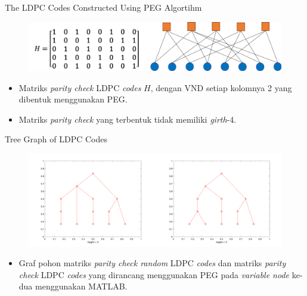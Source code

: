 \documentclass[11pt, aspectratio=169]{beamer}
\begin{document}
\begin{frame}{The LDPC Codes Constructed  Using PEG Algortihm}

\begin{figure}
	\centering 
	\includegraphics[scale=0.6]{gambarafa/PEGH}
	\centering 
	
	
\end{figure}
\begin{itemize}
	\item Matriks \textit{parity check} LDPC \textit{codes} $H$, dengan VND setiap kolomnya 2 yang dibentuk menggunakan PEG.  
	\item Matriks \textit{parity check} yang terbentuk tidak memiliki \textit{girth}-4.
\end{itemize}



\end{frame}
\begin{frame}{Tree Graph of LDPC Codes}
	\vspace{-0.5cm}
	\begin{figure}
		\centering 
		\includegraphics[scale=0.5]{gambarafa/treegrafmatlab2}
		\centering 
		
		
	\end{figure}
	\begin{itemize}
		\item Graf pohon matriks \textit{parity check random} LDPC \textit{codes} dan matriks \textit{parity check} LDPC \textit{codes} yang dirancang menggunakan PEG  pada \textit{variable node} ke-dua menggunakan MATLAB.
	\end{itemize}
	
	
	
\end{frame}
\end{document}
